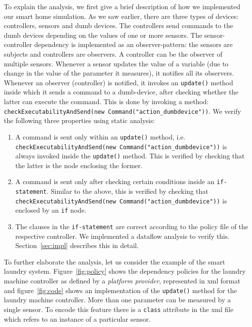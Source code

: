 \documentclass{article}
\begin{document}
To explain the analysis, we first give a brief description of how we implemented our smart home simulation. As we saw earlier, there are three types of devices: controllers, sensors and dumb devices. The controllers send commands to the dumb devices depending on the values of one or more sensors. The sensor-controller dependency is implemented as an observer-pattern: the sensors are subjects and controllers are observers. A controller can be the observer of multiple sensors. Whenever a sensor updates the value of a variable (due to change in the value of the parameter it measures), it notifies all its observers. Whenever an observer (controller) is notified, it invokes an \texttt{update()} method inside which it sends a command to a dumb-device, after checking whether the latter can execute the command. This is done by invoking a method: \texttt{checkExecutabilityAndSend(new Command("action\_dumbdevice"))}. 
We verify the following three properties using static analysis:
\begin{enumerate}[topsep=0pt,itemsep=-1ex,partopsep=1ex,parsep=1ex]
    \item A command is sent only within an \texttt{update()} method, i.e. \\
    \texttt{checkExecutabilityAndSend(new Command("action\_dumbdevice"))} is always invoked inside the \texttt{update()} method. This is verified by checking that the latter is the node enclosing the former.
    \item A command is sent only after checking certain conditions inside an \texttt{if-statement}. Similar to the above, this is verified by checking that \texttt{checkExecutabilityAndSend(new Command("action\_dumbdevice"))} is enclosed by an \texttt{if} node.
    \item The clauses in the \texttt{if-statement} are correct according to the policy file of the respective controller. We implemented a dataflow analysis to verify this. Section~\ref{sec:impl} describes this in detail.\\
\end{enumerate}

To further elaborate the analysis, let us consider the example of the smart laundry system. Figure~\ref{fig:policy} shows the dependency policies for the laundry machine controller as defined by a \textit{platform provider}, represented in xml format and figure~\ref{fig:code} shows an implementation of the \texttt{update()} method for the laundry machine controller. More than one parameter can be measured by a single sensor. To encode this feature there is a \texttt{class} attribute in the xml file which refers to an instance of a particular sensor.\\
\end{document}
